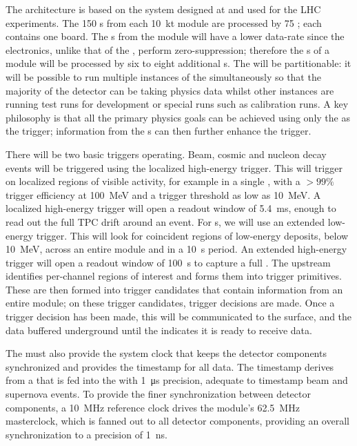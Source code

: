 The  architecture is based on the  system designed at  and used for the LHC
experiments. The 150 s from each \SI{10}{\kilo\tonne} module are processed by 75 ; each  contains one  board. The s from the module will have a lower data-rate since the  electronics, unlike that of the , perform zero-suppression; therefore the s of a module will be processed by six to eight additional s. The  will be partitionable: it will be possible to run multiple instances of the  simultaneously so that the majority of the detector can be taking physics data whilst other  instances are running test runs for development or special runs such as calibration runs. A key philosophy is that all the primary  physics goals can be achieved using only the  as the trigger; information from the s can then further enhance the trigger.

There will be two basic triggers operating. Beam, cosmic and nucleon decay events will be triggered using the localized high-energy trigger. This will trigger on localized regions of visible activity, for example in a single , with a $>99\%$ trigger efficiency at \SI{100}{\mega\electronvolt} and a trigger threshold as low as \SI{10}{\mega\electronvolt}. A localized high-energy trigger will open a readout window of \SI{5.4}{\ms}, enough to read out the full TPC drift around an event. For s, we will use an extended low-energy trigger. This will look for coincident regions of low-energy deposits, below \SI{10}{\mega\electronvolt}, across an entire module and in a \SI{10}{\second} period. An extended high-energy trigger will open a readout window of \SI{100}{\second} to capture a full . The upstream  identifies per-channel regions of interest and forms them into trigger primitives. These are then formed into trigger candidates that contain information from an entire module; on these trigger candidates, trigger decisions are made. Once a trigger decision has been made, this will be communicated to the surface, and the data buffered underground until the  indicates it is ready to receive data.

The  must also provide the system clock that keeps the detector components synchronized and provides the timestamp for all data. The timestamp derives from a   that is fed into the  with \SI{1}{\micro\second} precision, adequate to timestamp beam and supernova events. To provide the finer synchronization between detector components, a \SI{10}{\mega\hertz} reference clock drives the module's \SI{62.5}{\mega\hertz} masterclock, which is fanned out to all detector components, providing an overall synchronization to a precision of \SI{1}{\nano\second}.

